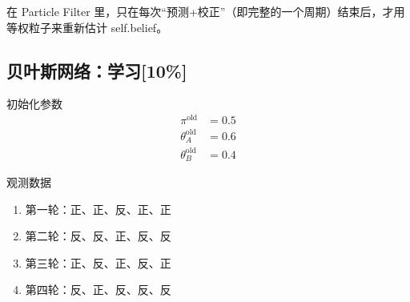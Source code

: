 \documentclass{article}
\begin{document}
在 Particle Filter 里，只在每次“预测+校正”（即完整的一个周期）结束后，才用等权粒子来重新估计 self.belief。

\subsection{贝叶斯网络：学习[10\%]}
初始化参数
\begin{align*}
	\pi^{\text{old}} &= 0.5 \\
	\theta_A^{\text{old}} &= 0.6 \\
	\theta_B^{\text{old}} &= 0.4
\end{align*}

观测数据
\begin{enumerate}
	\item 第一轮：正、正、反、正、正
	\item 第二轮：反、反、正、反、反
	\item 第三轮：正、反、正、反、正
	\item 第四轮：反、正、反、反、反
\end{enumerate}
\end{document}

